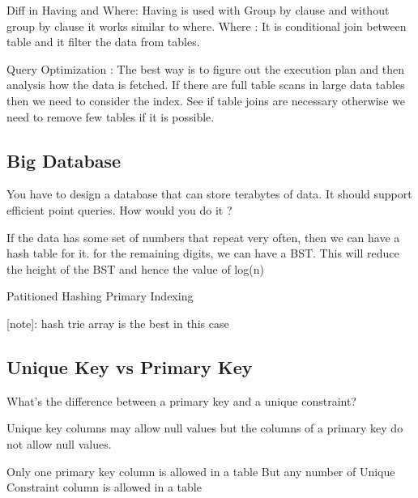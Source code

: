 Diff in Having and Where: 
Having is used with Group by clause and without group by clause it works similar to where. 
Where : It is conditional join between table and it filter the data from tables. 

Query Optimization : The best way is to figure out the execution plan and then analysis how the data is fetched. If there are full table scans in large data tables then we need to 
consider the index. See if table joins are necessary otherwise we need to remove few tables if it is possible. 

\subsection{Big Database}

You have to design a database that can store terabytes of data. It should support efficient point queries. How would you do it ?

If the data has some set of numbers that repeat very often, then we can have a hash table for it. for the remaining digits, we can have a BST. This will reduce the height of the 
BST and hence the value of log(n)

Patitioned Hashing Primary Indexing

[note]: hash trie array is the best in this case

\subsection{Unique Key vs Primary Key}
What's the difference between a primary key and a unique constraint?

Unique key columns may allow null values but the columns of a primary key do not allow null values.

Only one primary key column is allowed in a table 
But any number of Unique Constraint column is allowed in a table
